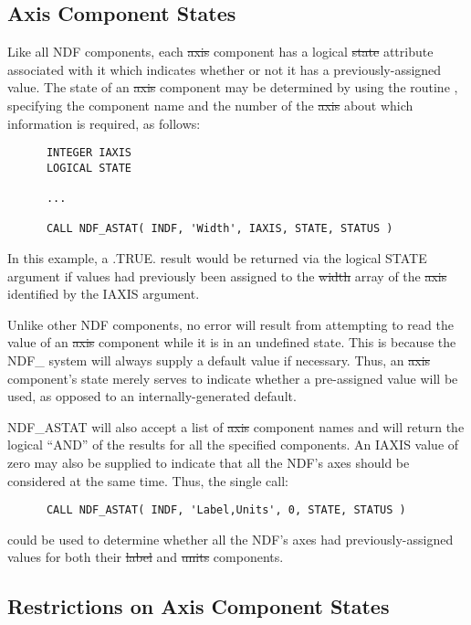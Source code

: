 \subsection{Axis Component States}

Like all NDF components, each \st{axis\/} component has a logical
\st{state\/} attribute associated with it which indicates whether or
not it has 
a previously-assigned value. 
The state of an \st{axis\/} component may be determined by using the routine
, specifying the component name and the number of the \st{axis\/}
about which information is required, as follows: 

\small
\begin{verbatim}
      INTEGER IAXIS
      LOGICAL STATE

      ...

      CALL NDF_ASTAT( INDF, 'Width', IAXIS, STATE, STATUS )
\end{verbatim}
\normalsize

In this example, a .TRUE. result would be returned via the logical STATE
argument if values had previously been assigned to the \st{width\/} array
of the \st{axis\/} identified by the IAXIS argument. 

Unlike other NDF components, no error will result from attempting to read
the value of an \st{axis\/} component while it is in an undefined state.
This is because the NDF\_ system will always supply a default value if
necessary. 
Thus, an \st{axis\/} component's state merely serves to indicate whether a
pre-assigned value will be used, as opposed to an internally-generated
default. 

NDF\_ASTAT will also accept a list of \st{axis\/} component names and
will return the logical ``AND'' of the results for all the specified
components.  An IAXIS value of zero may also be supplied to indicate
that all the NDF's axes should be considered at the same time.  Thus,
the single call:

\small
\begin{verbatim}
      CALL NDF_ASTAT( INDF, 'Label,Units', 0, STATE, STATUS )
\end{verbatim}
\normalsize

could be used to determine whether all the NDF's axes had
previously-assigned values for both their \st{label\/} and \st{units\/}
components. 

\subsection{\label{ss:axisstate}Restrictions on Axis Component States}

